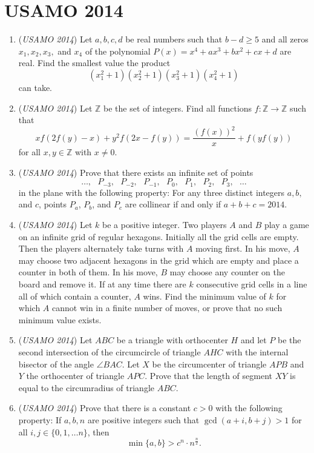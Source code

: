 \section{USAMO 2014}
        \begin{enumerate}
        	\item (\textit{USAMO 2014}) Let $a,b,c,d$ be real numbers such that $b-d \ge 5$ and all zeros $x_1, x_2, x_3,$ and $x_4$ of the polynomial $P(x)=x^4+ax^3+bx^2+cx+d$ are real. Find the smallest value the product 
 \[(x_1^2+1)(x_2^2+1)(x_3^2+1)(x_4^2+1)\] can take.


 

	\item (\textit{USAMO 2014}) Let $\mathbb{Z}$ be the set of integers. Find all functions $f : \mathbb{Z} \rightarrow \mathbb{Z}$ such that 
 \[xf(2f(y)-x)+y^2f(2x-f(y))=\frac{(f(x))^2}{x}+f(yf(y))\] for all $x, y \in \mathbb{Z}$ with $x \neq 0$.


 

	\item (\textit{USAMO 2014}) Prove that there exists an infinite set of points 
 \[\ldots,\,\,\,\,P_{-3},\,\,\,\,P_{-2},\,\,\,\,P_{-1},\,\,\,\,P_0,\,\,\,\,P_1,\,\,\,\,P_2,\,\,\,\,P_3,\,\,\,\,\ldots\] in the plane with the following property: For any three distinct integers $a,b,$ and $c$, points $P_a$, $P_b$, and $P_c$ are collinear if and only if $a+b+c=2014$.


 

	\item (\textit{USAMO 2014}) Let $k$ be a positive integer. Two players $A$ and $B$ play a game on an infinite grid of regular hexagons. Initially all the grid cells are empty. Then the players alternately take turns with $A$ moving first. In his move, $A$ may choose two adjacent hexagons in the grid which are empty and place a counter in both of them. In his move, $B$ may choose any counter on the board and remove it. If at any time there are $k$ consecutive grid cells in a line all of which contain a counter, $A$ wins. Find the minimum value of $k$ for which $A$ cannot win in a finite number of moves, or prove that no such minimum value exists.


 

	\item (\textit{USAMO 2014}) Let $ABC$ be a triangle with orthocenter $H$ and let $P$ be the second intersection of the circumcircle of triangle $AHC$ with the internal bisector of the angle $\angle BAC$.  Let $X$ be the circumcenter of triangle $APB$ and $Y$ the orthocenter of triangle $APC$.  Prove that the length of segment $XY$ is equal to the circumradius of triangle $ABC$.


 

	\item (\textit{USAMO 2014}) Prove that there is a constant $c>0$ with the following property: If $a, b, n$ are positive integers such that $\gcd(a+i, b+j)>1$ for all $i, j\in\{0, 1, \ldots n\}$, then
 \[\min\{a, b\}>c^n\cdot n^{\frac{n}{2}}.\]


\end{enumerate}